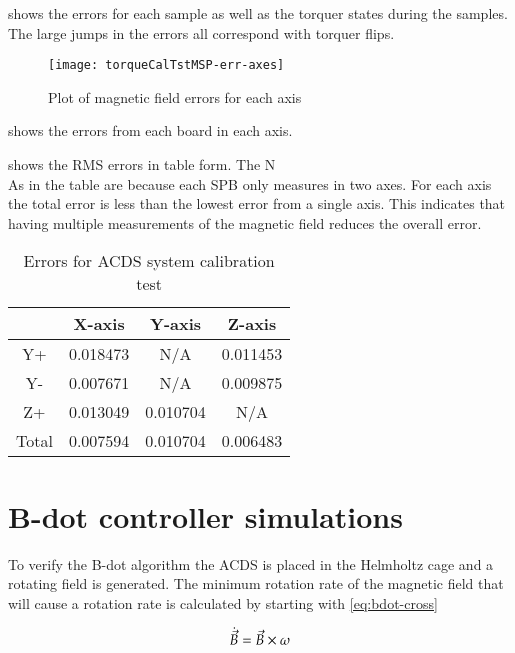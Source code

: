  shows the errors for each sample as well as the torquer states during the samples. The large jumps in the errors all correspond with torquer flips.

\begin{sidewaysfigure}
    \centering
    \texttt{[image: torqueCalTstMSP-err-axes]}
    \caption{Plot of magnetic field errors for each axis}
    \label{fig:tcalMSPerr-axis}
\end{sidewaysfigure}

 shows the errors from each board in each axis.

 shows the RMS errors in table form. The N\\As in the table are because each \ac{SPB} only measures in two axes. For each axis the total error is less than the lowest error from a single axis. This indicates that having multiple measurements of the magnetic field reduces the overall error.

\begin{table}[!ht]
    \centering
    \caption{Errors for \ac{ACDS} system calibration test}
    \label{tab:tcalMSPerr}
    \begin{tabular}{|c|c|c|c|}
        \hline
        &X-axis&Y-axis&Z-axis\\
        \hline
        Y+&0.018473&N/A&0.011453\\
        \hline
        Y-&0.007671&N/A&0.009875\\
        \hline
        Z+&0.013049&0.010704&N/A\\
        \hline
        Total&0.007594&0.010704&0.006483\\
        \hline
    \end{tabular}
\end{table}

\section{B-dot controller simulations}

To verify the B-dot algorithm the \ac{ACDS} is placed in the Helmholtz cage and a rotating field is generated. The minimum rotation rate of the magnetic field that will cause a rotation rate is calculated by starting with \cref{eq:bdot-cross}

\begin{equation}
    \dot{\vec{B}} = \vec{B} \times \omega
    \label{eq:bdot-cross}
\end{equation}

